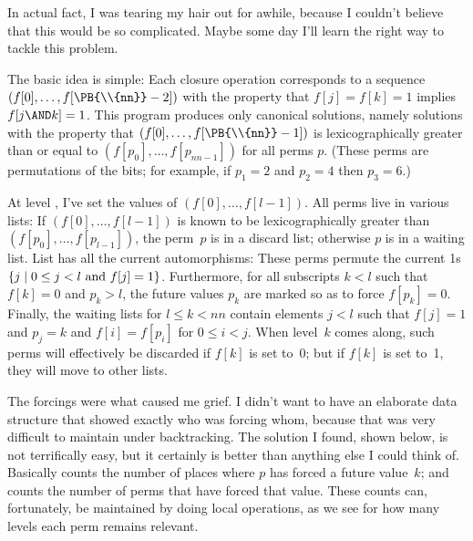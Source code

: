In actual fact, I was tearing my hair out for awhile, because I couldn't
believe that this would be so complicated. Maybe some day I'll learn
the right way to tackle this problem.

\fi

The basic idea is simple: Each closure operation
corresponds to
a sequence $(f[0],\ldots,f[\PB{\\{nn}}-2])$ with the property that
$f[j]=f[k]=1$ implies $f[j\AND k]=1$. This program produces only
canonical solutions, namely solutions with the property that
$(f[0],\ldots,f[\PB{\\{nn}}-1])$ is lexicographically greater than or equal to
$(f[p_0],\ldots,f[p_{nn-1}])$ for all perms $p$. (These perms are
permutations of the bits; for example, if $p_1=2$ and $p_2=4$ then
$p_3=6$.)

At level , I've set the values of $(f[0],\ldots,f[l-1])$.
All perms live in various lists: If $(f[0],\ldots,f[l-1])$ is known to
be lexicographically greater than $(f[p_0],\ldots,f[p_{l-1}])$,
the perm~$p$ is in a discard list; otherwise $p$ is in a waiting list.
List  has all the current automorphisms: These perms
permute the current 1s $\{j\mid 0\le j<l\ {\rm and}\ f[j]=1\}$.
Furthermore, for all subscripts $k<l$ such that $f[k]=0$ and $p_k>l$,
the future values $p_k$ are marked so as to force $f[p_k]=0$.
Finally, the waiting lists  for $l\le k<nn$ contain elements
$j<l$ such that $f[j]=1$ and $p_j=k$ and $f[i]=f[p_i]$ for
$0\le i<j$. When level~$k$ comes along, such perms will effectively
be discarded if $f[k]$ is set to~0; but if $f[k]$ is set to~1,
they will move to other lists.

The forcings were what caused me grief. I didn't want to have an
elaborate data structure that showed exactly who was forcing whom,
because that was very difficult to maintain under backtracking.
The solution I found, shown below, is not terrifically easy, but
it certainly is better than anything else I could think of.
Basically  counts the number of places where $p$ has
forced a future value~$k$; and  counts the number of perms
that have forced that value. These counts can, fortunately, be maintained by
doing local operations, as we see for how many levels
each perm remains relevant.


